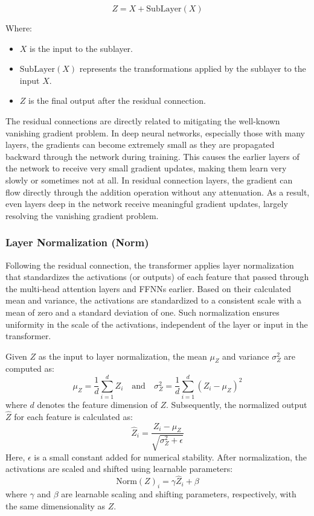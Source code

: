 \begin{equation}
    Z = X + \text{SubLayer}(X)
\end{equation}

Where:
\begin{itemize}
    \item \(X\) is the input to the sublayer.
    \item \(\text{SubLayer}(X)\) represents the transformations applied by the sublayer to the input \(X\).
    \item \(Z\) is the final output after the residual connection.
\end{itemize}

The residual connections are directly related to mitigating the well-known vanishing gradient problem. In deep neural networks, especially those with many layers, the gradients can become extremely small as they are propagated backward through the network during training. This causes the earlier layers of the network to receive very small gradient updates, making them learn very slowly or sometimes not at all. In residual connection layers, the gradient can flow directly through the addition operation without any attenuation. As a result, even layers deep in the network receive meaningful gradient updates, largely resolving the vanishing gradient problem. 

\subsubsection{Layer Normalization (Norm)}

Following the residual connection, the transformer applies layer normalization that standardizes the activations (or outputs) of each feature that passed through the multi-head attention layers and FFNNs earlier. Based on their calculated mean and variance, the activations are standardized to a consistent scale with a mean of zero and a standard deviation of one. Such normalization ensures uniformity in the scale of the activations, independent of the layer or input in the transformer.

Given \( Z \) as the input to layer normalization, the mean \( \mu_Z \) and variance \( \sigma_Z^2 \) are computed as:
\[
\mu_Z = \frac{1}{d} \sum_{i=1}^{d} Z_i \quad \text{and} \quad \sigma_Z^2 = \frac{1}{d} \sum_{i=1}^{d} (Z_i - \mu_Z)^2
\]
where \( d \) denotes the feature dimension of \( Z \). Subsequently, the normalized output \( \hat{Z} \) for each feature is calculated as:
\[
\hat{Z}_i = \frac{Z_i - \mu_Z}{\sqrt{\sigma_Z^2 + \epsilon}}
\]
Here, \( \epsilon \) is a small constant added for numerical stability. After normalization, the activations are scaled and shifted using learnable parameters:
\[
\text{Norm}(Z)_i = \gamma \hat{Z}_i + \beta
\]
where \( \gamma \) and \( \beta \) are learnable scaling and shifting parameters, respectively, with the same dimensionality as \( Z \).

